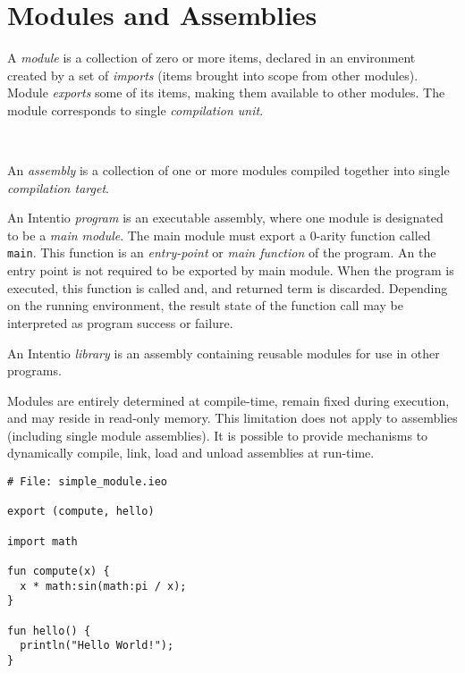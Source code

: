 \chapter{Modules and Assemblies}

A \emph{module} is a collection of zero or more items, declared in an environment created by a set of \emph{imports} (items brought into scope from other modules). Module \emph{exports} some of its items, making them available to other modules. The module corresponds to single \emph{compilation unit}.

\begin{bnf}
   \eq {} \ 
\end{bnf}

An \emph{assembly} is a collection of one or more modules compiled together into single \emph{compilation target}.

An Intentio \emph{program} is an executable assembly, where one module is designated to be a \emph{main module}. The main module must export a 0-arity function called \lstinline{main}. This function is an \emph{entry-point} or \emph{main function} of the program. An the entry point is not required to be exported by main module. When the program is executed, this function is called and, and returned term is discarded. Depending on the running environment, the result state of  the function call may be interpreted as program success or failure.

An Intentio \emph{library} is an assembly containing reusable modules for use in other programs.

Modules are entirely determined at compile-time, remain fixed during execution, and may reside in read-only memory. This limitation does not apply to assemblies (including single module assemblies). It is possible to provide mechanisms to dynamically compile, link, load and unload assemblies at run-time.

\begin{example}
\begin{lstlisting}
# File: simple_module.ieo

export (compute, hello)

import math

fun compute(x) {
  x * math:sin(math:pi / x);
}

fun hello() {
  println("Hello World!");
}
\end{lstlisting}
\end{example}

